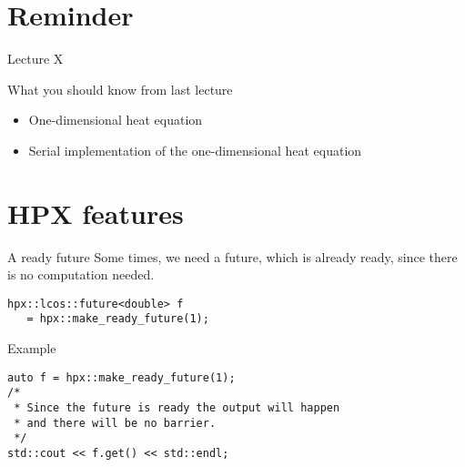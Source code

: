 \documentclass[12pt,t]{beamer}
\title{\coursename}
\subtitle{Lecture 13: Futurization of the 1D heat equation}
\date {
 \tiny \url{\courseurl}
\vspace{2cm}
\doclicenseThis  
  
}
\begin{document}
 {
    \frame {
        \titlepage
    }
}

\frame{

\tableofcontents

}


\section{Reminder}
\begin{frame}{Lecture X}
\begin{block}{What you should know from last lecture}
\begin{itemize}
\item One-dimensional heat equation 
\item Serial implementation of the one-dimensional heat equation
\end{itemize}
\end{block}
\end{frame}

\section{HPX features}

\begin{frame}[fragile]{A ready future}
Some times, we need a future, which is already ready, since there is no computation needed.


\begin{lstlisting}
hpx::lcos::future<double> f 
   = hpx::make_ready_future(1);
\end{lstlisting}

\begin{block}{Example}
\begin{lstlisting}
auto f = hpx::make_ready_future(1);
/* 
 * Since the future is ready the output will happen
 * and there will be no barrier.
 */
std::cout << f.get() << std::endl;
\end{lstlisting}
\end{block}

\end{frame}
\end{document}
